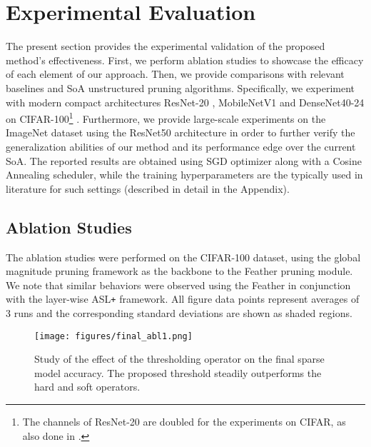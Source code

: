 \documentclass{article}
\begin{document}
\section{Experimental Evaluation}
\label{sec:experimental}


The present section provides the experimental validation of the proposed method's effectiveness. First, we perform ablation studies to showcase the efficacy of each element of our approach. Then, we provide comparisons with relevant baselines and SoA unstructured pruning algorithms. 
Specifically, we experiment with modern compact architectures ResNet-20 \cite{he2016deep}, MobileNetV1 \cite{howard2017mobilenets} and DenseNet40-24 \cite{huang2017densely} on CIFAR-100\footnote{The channels of ResNet-20 are doubled for the experiments on CIFAR, as also done in \cite{zhou2021effective, wang2020picking}.}  \cite{krizhevsky2009learning}.
Furthermore, we provide large-scale experiments on the ImageNet \cite{deng2009imagenet} dataset using the ResNet50 \cite{he2016deep} architecture in order to further verify the generalization abilities of our method and its performance edge over the current SoA. The reported results are obtained using SGD optimizer along with a Cosine Annealing scheduler, while the training hyperparameters are the typically used in literature for such settings (described in detail in the Appendix).


\subsection{Ablation Studies}
\label{sec:ablations}


The ablation studies were performed on the CIFAR-100 dataset, using the global magnitude pruning framework as the backbone to the Feather pruning module. We note that similar behaviors were observed using the Feather in conjunction with the layer-wise ASL\texttt{+} framework. All figure data points represent averages of 3 runs and the corresponding standard deviations are shown as shaded regions.

\begin{figure}[h]
	\centering
  \texttt{[image: figures/final\_abl1.png]}
\caption{Study of the effect of the thresholding operator on the final sparse model accuracy. The proposed threshold steadily outperforms the hard and soft operators.}
\label{fig:abl1}
\end{figure}
\end{document}
